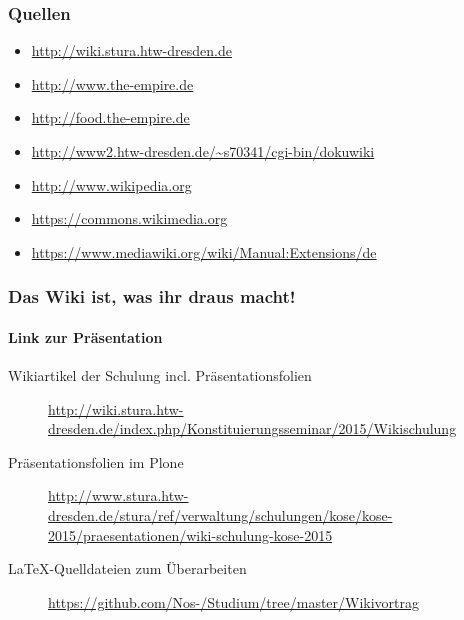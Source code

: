 \documentclass{beamer}              %
\begin{document}
\begin{frame}
  \frametitle{Quellen}
  \begin{itemize}
    \item \url{http://wiki.stura.htw-dresden.de}
    \item \url{http://www.the-empire.de}
    \item \url{http://food.the-empire.de}
    \item \url{http://www2.htw-dresden.de/~s70341/cgi-bin/dokuwiki}
    \item \url{http://www.wikipedia.org}
    \item \url{https://commons.wikimedia.org}
    \item \url{https://www.mediawiki.org/wiki/Manual:Extensions/de}
  \end{itemize}  
\end{frame}




% 
% 
%
%

\begin{frame}
  \frametitle{Das Wiki ist, was ihr draus macht!}
  \framesubtitle{Link zur Präsentation}
	\begin{description}
		\item[Wikiartikel der Schulung incl. Präsentationsfolien] \url{http://wiki.stura.htw-dresden.de/index.php/Konstituierungsseminar/2015/Wikischulung}
		\item[Präsentationsfolien im Plone] \url{http://www.stura.htw-dresden.de/stura/ref/verwaltung/schulungen/kose/kose-2015/praesentationen/wiki-schulung-kose-2015}
		\item[LaTeX-Quelldateien zum Überarbeiten] \url{https://github.com/Nos-/Studium/tree/master/Wikivortrag}
	\end{description}
\end{frame}
\end{document}
